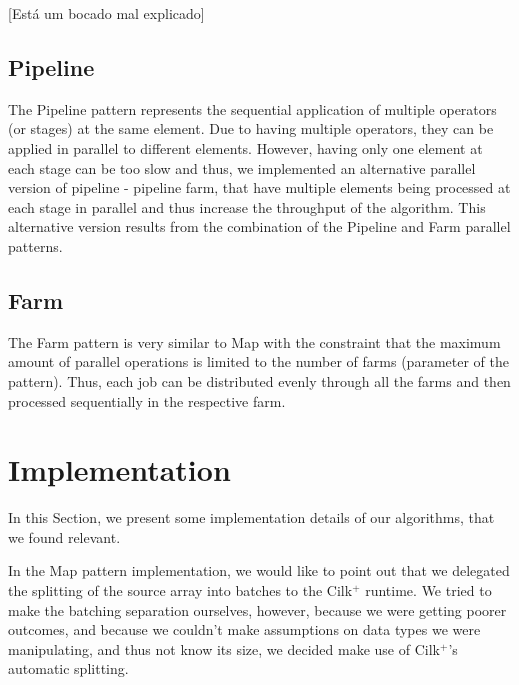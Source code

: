 \documentclass[conference,compsoc]{IEEEtran}
\begin{document}
[Está um bocado mal explicado]

\subsection{Pipeline}
The Pipeline pattern represents the sequential application of multiple operators (or stages) at the same element. Due to having multiple operators, they can be applied in parallel to different elements. However, having only one element at each stage can be too slow and thus, we implemented an alternative parallel version of pipeline - pipeline farm, that have multiple elements being processed at each stage in parallel and thus increase the throughput of the algorithm. This alternative version results from the combination of the Pipeline and Farm parallel patterns.


\subsection{Farm}
The Farm pattern is very similar to Map with the constraint that the maximum amount of parallel operations is limited to the number of farms (parameter of the pattern). Thus, each job can be distributed evenly through all the farms and then processed sequentially in the respective farm.

\section{Implementation} \label{Implementation}

In this Section, we present some implementation details of our algorithms, that we found relevant.

In the Map pattern implementation, we would like to point out that we delegated the splitting of the source array into batches to the Cilk$^+$ runtime.
We tried to make the batching separation ourselves, however, because we were getting poorer outcomes, and because we couldn't make assumptions on data types we were manipulating, and thus not know its size, we decided make use of Cilk$^+$'s automatic splitting.
\end{document}
